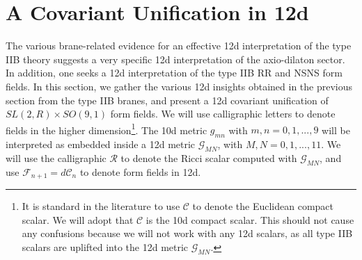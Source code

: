 \section{A Covariant Unification in 12d}
The various brane-related evidence for an effective 12d interpretation of the type IIB theory suggests a very specific 12d interpretation of the axio-dilaton sector.
In addition, one seeks a 12d interpretation of the type IIB RR and NSNS form fields.
In this section, we gather the various 12d insights obtained in the previous section from the type IIB branes, and present a 12d covariant unification of $SL(2,R)\times SO(9,1)$ form fields.
We will use calligraphic letters to denote fields in the higher dimension\footnote{
It is standard in the literature to use $\mathcal C$ to denote the Euclidean compact scalar.
We will adopt that $\mathcal C$ is the 10d compact scalar.
This should not cause any confusions because we will not work with any 12d scalars, as all type IIB scalars are uplifted into the 12d metric $\mathcal G_{MN}$.
}.
The 10d metric $g_{mn}$ with $m,n=0,1,...,9$ will be interpreted as embedded inside a 12d metric $\mathcal G_{MN}$, with $M,N=0,1,...,11$. We will use the calligraphic $\mathcal R$ to denote the Ricci scalar computed with $\mathcal G_{MN}$, and use $\mathcal F_{n+1} = d\mathcal C_{n}$ to denote form fields in 12d.

